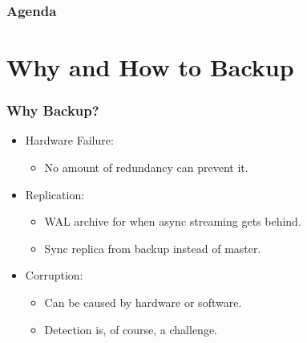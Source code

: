 %
\def\mytitle{Backup Best Practices (Draft)}
\def\mysubject{}
\def\myevent{}
\def\myauthor{David Steele}
\def\myemail{}
\def\mydate{November 16, 2017}

\def\mysuppressnav{}

\def\mytemplatepath{/template/}


\begin{frame}
    \frametitle{Agenda}
    \tableofcontents
\end{frame}

\section{Why and How to Backup}

\begin{frame}
    \frametitle{Why Backup?}

    \begin{itemize}
        \item Hardware Failure:

        \begin{itemize}
            \item No amount of redundancy can prevent it.\pause
        \end{itemize}

        \item Replication:

        \begin{itemize}
            \item WAL archive for when async streaming gets behind.\pause
            \item Sync replica from backup instead of master.\pause
        \end{itemize}

        \item Corruption:

        \begin{itemize}
            \item Can be caused by hardware or software.\pause
            \item Detection is, of course, a challenge.
        \end{itemize}
    \end{itemize}
\end{frame}

